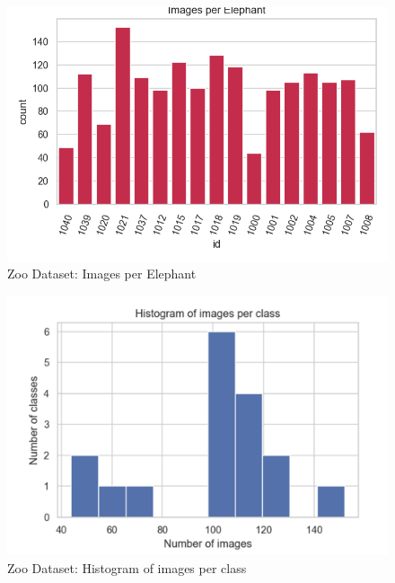 \documentclass[10pt,twocolumn,letterpaper]{article}
\begin{document}
\begin{figure}[t]
  \centering
  \includegraphics[scale=0.55]{zoo_images_per_class}
   \caption{Zoo Dataset: Images per Elephant}
   \label{fig:zoo_images_per_class}
\end{figure}


\begin{figure}[t]
  \centering
  \includegraphics[scale=0.32]{zoo_histogram}
   \caption{Zoo Dataset: Histogram of images per class}
   \label{fig:zoo_histogram}
\end{figure}
\end{document}
